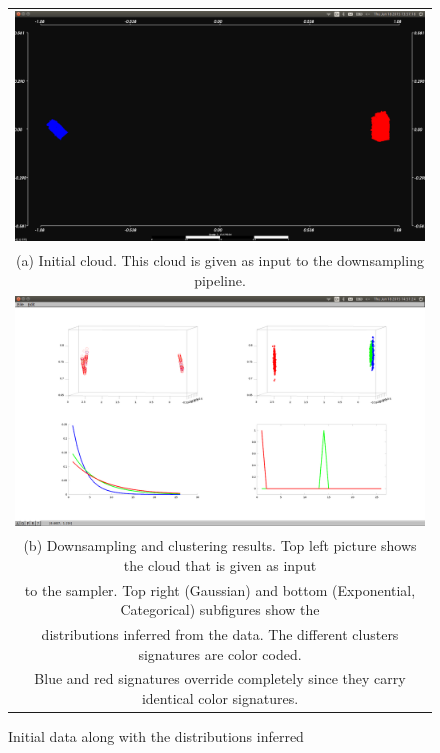 \documentclass [twoside,hidelinks]{article}
\begin{document}
\begin{figure}
\begin{tabular}{c}
  \includegraphics [width=1\textwidth]{clusterings/initialData} \\
   (a) Initial cloud. This cloud is given as input to the downsampling pipeline.  \\
   \includegraphics [width=1\textwidth]{clusterings/colorcodedDistributions} \\
  (b) Downsampling and clustering results. Top left picture shows the cloud that is given as input\\
 to the sampler. Top right (Gaussian) and bottom (Exponential, Categorical) subfigures show the \\
 distributions inferred from the data.  The different clusters signatures  are color coded. \\
 Blue and red signatures override completely since they carry identical color signatures.\\
 \end{tabular}
\caption{Initial data along with the distributions inferred }
  \label{pcl:clust}
\end{figure}
\end{document}
